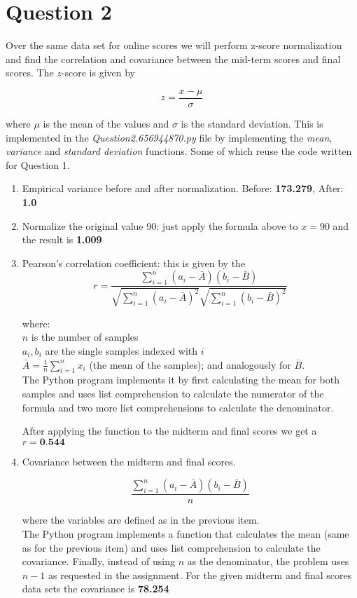 \documentclass[11pt]{article}
\begin{document}
\newpage \nocite{*}

\section*{Question 2}
Over the same data set for online scores we will perform z-score normalization and find the correlation and covariance between the mid-term scores and final scores. The $z$-score is given by

\[ z = \frac{x - \mu}{\sigma} \]

where $\mu$ is the mean of the values and $\sigma$ is the standard deviation. This is implemented in the \textit{Question2.656944870.py} file by implementing the \textit{mean}, \textit{variance} and \textit{standard deviation} functions. Some of which reuse the code written for Question 1.

\begin{enumerate}[label=(\alph*)]
\item Empirical variance before and after normalization. Before: \textbf{173.279}, After: \textbf{1.0}

\item Normalize the original value 90: just apply the formula above to $x = 90$ and the result is \textbf{1.009}

\item Pearson's correlation coefficient: this is given by the 
\[ r =\frac{\displaystyle \sum ^n _{i=1}(a_i - \bar{A})(b_i - \bar{B})}{\sqrt{\displaystyle \sum ^n _{i=1}(a_i - \bar{A})^2} \sqrt{\displaystyle \sum ^n _{i=1}(b_i - \bar{B})^2}} \]

where:\\
$n$ is the number of samples\\
$a_i, b_i$ are the single samples indexed with $i$\\
$\bar{A}=\frac{1}{n}\sum_{i=1}^n x_i$ (the mean of the samples); and analogously for $\bar{B}$.\\

The Python program implements it by first calculating the mean for both samples and uses list comprehension to calculate the numerator of the formula and two more list comprehensions to calculate the denominator.

After applying the function to the midterm and final scores we get a $r = \textbf{0.544}$

\item Covariance between the midterm and final scores. 

\[ \frac{\displaystyle \sum ^n_{i=1} (a_i - \bar{A})(b_i - \bar{B})}{n} \]

where the variables are defined as in the previous item.\\

The Python program implements a function that calculates the mean (same as for the previous item) and uses list comprehension to calculate the covariance. Finally, instead of using $n$ as the denominator, the problem uses $n - 1$ as requested in the assignment. For the given midterm and final scores data sets the covariance is \textbf{78.254}

\end{enumerate}
\newpage \nocite{*}
\end{document}
